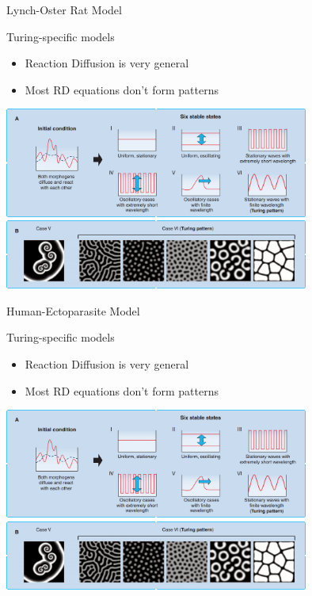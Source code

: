 \documentclass[t,10pt,fleqn]{beamer}
\begin{document}
\begin{frame}{Lynch-Oster Rat Model}
  \vspace{-.3cm}
  \begin{block}{Turing-specific models}
    \begin{itemize}
      \item Reaction Diffusion is very general
      \pause
      \item Most RD equations don't form patterns
      \pause
    \end{itemize}
      \includegraphics[width=0.75\textwidth]{stable_states.png}\\
      \pause
      \includegraphics[width=0.75\textwidth]{turing_pattern.png}
  \end{block}
  \pause
\end{frame}

\begin{frame}{Human-Ectoparasite Model}
  \vspace{-.3cm}
  \begin{block}{Turing-specific models}
    \begin{itemize}
      \item Reaction Diffusion is very general
      \pause
      \item Most RD equations don't form patterns
      \pause
    \end{itemize}
      \includegraphics[width=0.75\textwidth]{stable_states.png}\\
      \pause
      \includegraphics[width=0.75\textwidth]{turing_pattern.png}
  \end{block}
  \pause
\end{frame}
\end{document}
